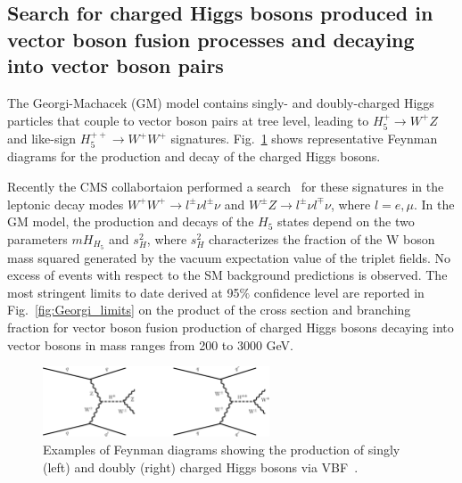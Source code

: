 \documentclass{blois}
\begin{document}
\subsection{Search for charged Higgs bosons produced in vector boson fusion processes and decaying into vector boson pairs}
The Georgi-Machacek (GM) model contains singly- and doubly-charged Higgs particles that couple
to vector boson pairs at tree level, leading to $H_{5}^{+} \rightarrow W^{+} Z$ and like-sign $H_{5}^{++} \rightarrow W^{+}W^{+}$ signatures.
Fig.~\ref{fig:Georgi_diagrams} shows representative Feynman diagrams for the production and decay of the charged Higgs bosons.

Recently the CMS collabortaion performed a search~\cite{CMS:2021wlt} for these signatures in the leptonic decay modes $W^{+}W^{+} \rightarrow l^{\pm}\nu l^{\pm}\nu$ and $W^{\pm}Z \rightarrow l^{\pm}\nu l^{\mp}\nu$, where $l= e, \mu$.
In the GM model, the production and decays of the $H_{5}$ states depend on the two parameters $mH_{H_{5}}$ and $s_{H}^{2}$, where $s_{H}^{2}$ characterizes the fraction of the W boson mass squared generated by the vacuum expectation value of the triplet fields. No excess of events with respect to the SM background predictions is observed. The most stringent limits to date derived at 95$\%$ confidence level are reported in Fig.~\ref{fig:Georgi_limits} on the product of the cross section and branching fraction for vector boson fusion production of charged Higgs bosons decaying into vector bosons in mass ranges from 200 to 3000 GeV.

 \begin{figure}[!htb]
    \begin{center}
        \includegraphics[width=0.6\textwidth]{CMS-HIG-20-017_Figure_001.png}
        \caption{
              Examples of Feynman diagrams showing the production of singly (left) and doubly (right) charged Higgs bosons via VBF~\protect\cite{CMS:2021wlt}.
        }
        \label{fig:Georgi_diagrams}
    \end{center}
\end{figure}
\end{document}
